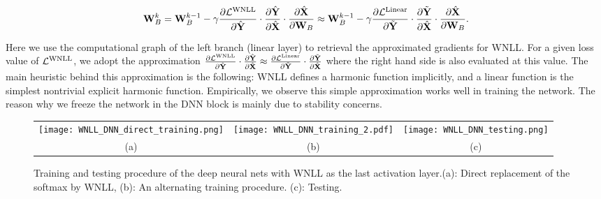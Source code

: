 \documentclass{article}
\begin{document}
\begin{equation}
\mathbf{W}_B^{k} =  \mathbf{W}_B^{k-1} - \gamma \frac{\partial \mathcal{L}^{\rm WNLL}}{\partial \hat{\mathbf{Y}}}\cdot \frac{\partial \hat{\mathbf{Y}}}{\partial \hat{\mathbf{X}}}\cdot \frac{\partial \hat{\mathbf{X}}}{\partial \mathbf{W}_B} \approx \mathbf{W}_B^{k-1} - \gamma \frac{\partial \mathcal{L}^{\rm Linear}}{\partial \tilde{\mathbf{Y}}}\cdot \frac{\partial \tilde{\mathbf{Y}}}{\partial \hat{\mathbf{X}}}\cdot \frac{\partial \hat{\mathbf{X}}}{\partial \mathbf{W}_B}.
\label{eq:bp-wnll}
\end{equation}

Here we use the computational graph of the left branch (linear layer) to retrieval the approximated gradients for WNLL. For a given loss value of $\mathcal{L}^{\rm WNLL}$, we adopt the approximation
$\frac{\partial \mathcal{L}^{\rm WNLL}}{\partial \hat{\mathbf{Y}}}\cdot \frac{\partial \hat{\mathbf{Y}}}{\partial \hat{\mathbf{X}}} \approx \frac{\partial \mathcal{L}^{\rm Linear}}{\partial \tilde{\mathbf{Y}}}\cdot \frac{\partial \tilde{\mathbf{Y}}}{\partial \hat{\mathbf{X}}}$ where the right hand side is also evaluated at this value.
The main heuristic behind this approximation is the following: WNLL defines a harmonic function implicitly, and a linear function is the simplest nontrivial explicit harmonic function. Empirically, we observe this simple approximation works well in training the network. The reason why we freeze the network in the DNN block is mainly due to stability concerns. 





\begin{figure}[h]
\centering
\begin{tabular}{ccc}
\texttt{[image: WNLL\_DNN\_direct\_training.png]}&
\texttt{[image: WNLL\_DNN\_training\_2.pdf]}&
\texttt{[image: WNLL\_DNN\_testing.png]}\\
(a)&(b)&(c)\\
\end{tabular}
\caption{Training and testing procedure of the deep neural nets with WNLL as the last activation layer.(a): Direct replacement of the softmax by WNLL, (b): An alternating training procedure. (c): Testing.}
\label{fig:WNLL-DNN-Structure}
\end{figure}
\end{document}
